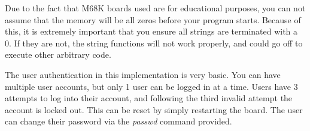\documentclass{article}
\begin{document}

Due to the fact that M68K boards used are for educational purposes, you can not assume that the memory will be all zeros before your program starts. Because of this, it is extremely important that you ensure all strings are terminated with a 0. If they are not, the string functions will not work properly, and could go off to execute other arbitrary code.\\


The user authentication in this implementation is very basic. You can have multiple user accounts, but only 1 user can be logged in at a time. Users have 3 attempts to log into their account, and following the third invalid attempt the account is locked out. This can be reset by simply restarting the board. The user can change their password via the \emph{passwd} command provided.
\end{document}
